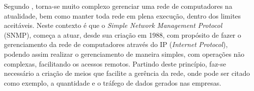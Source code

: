 \par Segundo , torna-se muito complexo
gerenciar uma rede de computadores na atualidade, bem como manter toda rede em
plena execução, dentro dos limites aceitáveis. Neste contexto é que o 
\textit{Simple Network Management Protocol} (SNMP), começa a atuar,
desde sua criação em 1988, com propósito de fazer o gerenciamento da rede de
computadores através do IP (\textit{Internet Protocol}), podendo assim realizar
o gerenciamento de maneira simples, com operações não complexas, facilitando os acessos remotos.
Partindo deste princípio, faz-se necessário a criação de meios que facilite a
gerência da rede, onde pode ser citado como exemplo, a quantidade e o tráfego de dados gerados nas
empresas. 

